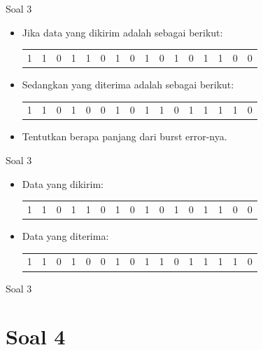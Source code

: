\documentclass[aspectratio=169]{beamer}
\begin{document}
\begin{frame}[t]{Soal 3}
	\begin{itemize}
		\item Jika data yang dikirim adalah sebagai berikut:\\
		
		\begin{tabular}{cccccccccccccccc}
			1 & 1 & 0 & 1 & 1 & 0 & 1 & 0 & 1 & 0 & 1 & 0 & 1 & 1 & 0 & 0 \\
		\end{tabular}
	
		\item Sedangkan yang diterima adalah sebagai berikut: \\
		
		\begin{tabular}{cccccccccccccccc}
			1 & 1 & 0 & 1 & 0 & 0 & 1 & 0 & 1 & 1 & 0 & 1 & 1 & 1 & 1 & 0 \\
		\end{tabular}
		\item Tentutkan berapa panjang dari burst error-nya.
	\end{itemize}
\end{frame}

\begin{frame}[t]{Soal 3}
	\begin{itemize}
		\item Data yang dikirim:\\
		
		\begin{tabular}{cccccccccccccccc}
			1 & 1 & 0 & 1 & 1 & 0 & 1 & 0 & 1 & 0 & 1 & 0 & 1 & 1 & 0 & 0 \\
		\end{tabular}
		
		\item Data yang diterima: \\
		
		\begin{tabular}{cccccccccccccccc}
			1 & 1 & 0 & 1 & 0 & 0 & 1 & 0 & 1 & 1 & 0 & 1 & 1 & 1 & 1 & 0 \\
		\end{tabular}
	
	\end{itemize}
\end{frame}

\begin{frame}[t]{Soal 3}
	
\end{frame}

\section{Soal 4}
\end{document}
